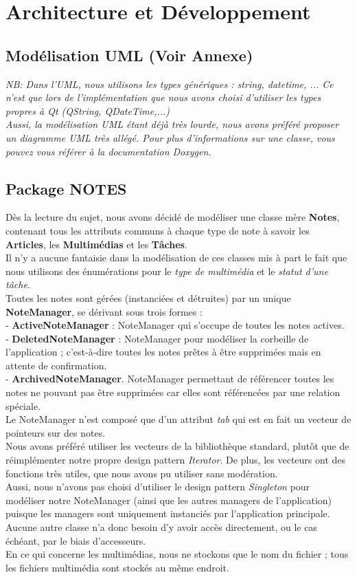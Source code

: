 \documentclass[a4paper]{report}
\begin{document}
\newpage
\section{Architecture et Développement}
\subsection{Modélisation UML (Voir Annexe)}

\textit{NB: Dans l'UML, nous utilisons les types génériques : string, datetime, ... Ce n'est que lors de l'implémentation que nous avons choisi d'utiliser les types propres à Qt (QString, QDateTime,...) \\ Aussi, la modélisation UML étant déjà très lourde, nous avons préféré proposer un diagramme UML très allégé. Pour plus d'informations sur une classe, vous pouvez vous référer à la documentation Doxygen.}

\subsection{Package NOTES}
Dès la lecture du sujet, nous avons décidé de modéliser une classe mère \textbf{Notes}, contenant tous les attributs communs à chaque type de note à savoir les \textbf{Articles}, les \textbf{Multimédias} et les \textbf{Tâches}.\\
Il n'y a aucune fantaisie dans la modélisation de ces classes mis à part le fait que nous utilisons des énumérations pour le \textit{type de multimédia} et le \textit{statut d'une tâche}. \\
Toutes les notes sont gérées (instanciées et détruites) par un unique \textbf{NoteManager}, se dérivant sous trois formes : \\
- \textbf{ActiveNoteManager} : NoteManager qui s'occupe de toutes les notes actives.\\
- \textbf{DeletedNoteManager} : NoteManager pour modéliser la corbeille de l'application ; c'est-à-dire toutes les notes prêtes à être supprimées mais en attente de confirmation. \\
- \textbf{ArchivedNoteManager}. NoteManager permettant de référencer toutes les notes ne pouvant pas être supprimées car elles sont référencées par une relation spéciale.\\
Le NoteManager n'est composé que d'un attribut \textit{tab} qui est en fait un vecteur de pointeurs sur des notes.\\
Nous avons préféré utiliser les vecteurs de la bibliothèque standard, plutôt que de réimplémenter notre propre design pattern \textit{Iterator}. De plus, les vecteurs ont des fonctions très utiles, que nous avons pu utiliser sans modération. \\
Aussi, nous n'avons pas choisi d'utiliser le design pattern \textit{Singleton} pour modéliser notre NoteManager (ainsi que les autres managers de l'application) puisque les managers sont uniquement instanciés par l'application principale. Aucune autre classe n'a donc besoin d'y avoir accès directement, ou le cas échéant, par le biais d'accesseurs.\\
En ce qui concerne les multimédias, nous ne stockons que le nom du fichier ; tous les fichiers multimédia sont stockés au même endroit.
\end{document}
